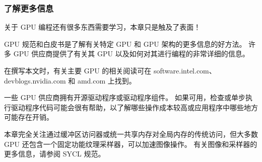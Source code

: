 \subsubsection{了解更多信息}
关于 GPU 编程还有很多东西需要学习，本章只是触及了表面！

GPU 规范和白皮书是了解有关特定 GPU 和 GPU 架构的更多信息的好方法。 许多 GPU 供应商提供了有关其 GPU 以及如何对其进行编程的非常详细的信息。

在撰写本文时，有关主要 GPU 的相关阅读可在 software.intel.com、devblogs.nvidia.com 和 amd.com 上找到。

一些 GPU 供应商拥有开源驱动程序或驱动程序组件。 如果可用，检查或单步执行驱动程序代码可能会很有帮助，以了解哪些操作成本较高或应用程序中哪些地方可能存在开销。

本章完全关注通过缓冲区访问器或统一共享内存对全局内存的传统访问，但大多数 GPU 还包含一个固定功能纹理采样器，可以加速图像操作。 有关图像和采样器的更多信息，请参阅 SYCL 规范。